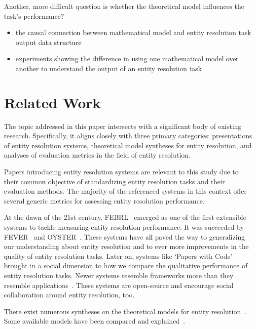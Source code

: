 \documentclass[lettersize,journal]{IEEEtran}
\begin{document}
    Another, more difficult question is whether the theoretical model influences
    the task's performance?

    \begin{itemize}
        \item the causal connection between mathematical model and entity
        resolution task output data structure
        \item experiments showing the difference in using one mathematical model
        over another to understand the output of an entity resolution task
    \end{itemize}

    \section{Related Work}\label{sec:related}
    
    The topic addressed in this paper intersects with a significant body of
    existing research.
    Specifically, it aligns closely with three primary categories: presentations
    of entity resolution systems, theoretical model syntheses for entity
    resolution, and analyses of evaluation metrics in the field of entity
    resolution.

    Papers introducing entity resolution systems are relevant to this study due
    to their common objective of standardizing entity resolution tasks and their
    evaluation methods.
    The majority of the referenced systems in this context offer several generic
    metrics for assessing entity resolution performance.

    At the dawn of the 21st century, FEBRL~\cite{febrl2002} emerged as one of the
    first extensible systems to tackle measuring entity resolution performance.
    It was succeeded by FEVER~\cite{fever2009} and OYSTER~\cite{oyster2012}.
    These systems have all paved the way to generalizing our understanding about
    entity resolution and to ever more improvements in the quality of entity
    resolution tasks.
    Later on, systems like `Papers with Code'~\cite{papwithcode2019} brought in
    a social dimension to how we compare the qualitative performance of entity
    resolution tasks.
    Newer systems resemble frameworks more than they resemble
    applications~\cite{magellan2020,jedai2017}.
    These systems are open-source and encourage social collaboration around
    entity resolution, too.
    
    There exist numerous syntheses on the theoretical models for entity
    resolution~\cite{fs1969,Ben2009Swoosh,Tal11}.
    Some available models have been compared and explained~\cite{Tal11,tal2013}.
\end{document}
